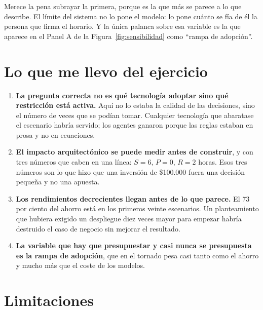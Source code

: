 \documentclass[11pt,letterpaper]{article}
\begin{document}
Merece la pena subrayar la primera, porque es la que más se parece a lo que
\textcite{nanda2025} describe. El límite del sistema no lo pone el modelo: lo
pone cuánto se fía de él la persona que firma el horario. Y la única palanca
sobre esa variable es la que aparece en el Panel A de la
Figura~\ref{fig:sensibilidad} como \enquote{rampa de adopción}.

\section{Lo que me llevo del ejercicio}

\begin{enumerate}
\item \textbf{La pregunta correcta no es qué tecnología adoptar sino qué
  restricción está activa.} Aquí no lo estaba la calidad de las decisiones,
  sino el número de veces que se podían tomar. Cualquier tecnología que
  abaratase el escenario habría servido; los agentes ganaron porque las reglas
  estaban en prosa y no en ecuaciones.
\item \textbf{El impacto arquitectónico se puede medir antes de construir}, y
  con tres números que caben en una línea: $S = 6$, $P = 0$, $R = 2$ horas.
  Esos tres números son lo que hizo que una inversión de \$100.000 fuera una
  decisión pequeña y no una apuesta.
\item \textbf{Los rendimientos decrecientes llegan antes de lo que parece.} El
  73 por ciento del ahorro está en los primeros veinte escenarios. Un
  planteamiento que hubiera exigido un despliegue diez veces mayor para
  empezar habría destruido el caso de negocio sin mejorar el resultado.
\item \textbf{La variable que hay que presupuestar y casi nunca se
  presupuesta es la rampa de adopción}, que en el tornado pesa casi tanto como
  el ahorro y mucho más que el coste de los modelos.
\end{enumerate}

\section{Limitaciones}
\end{document}
